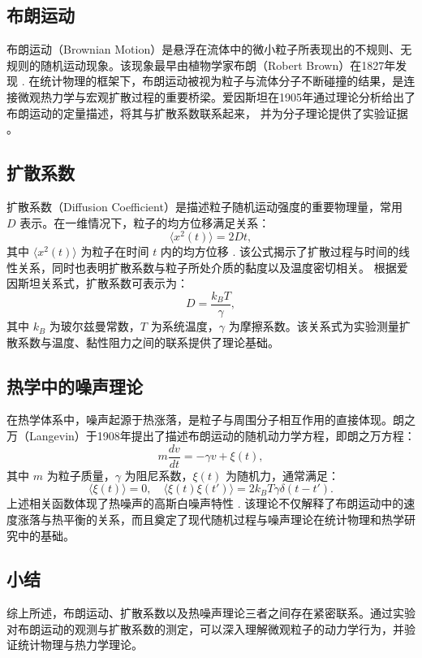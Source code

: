 \documentclass[a4paper]{report} %
\begin{document}
\subsection{布朗运动}
布朗运动（Brownian Motion）是悬浮在流体中的微小粒子所表现出的不规则、无规则的随机运动现象。该现象最早由植物学家布朗（Robert Brown）在1827年发现 \cite{brown1828}. 
在统计物理的框架下，布朗运动被视为粒子与流体分子不断碰撞的结果，是连接微观热力学与宏观扩散过程的重要桥梁。爱因斯坦在1905年通过理论分析给出了布朗运动的定量描述，将其与扩散系数联系起来，
并为分子理论提供了实验证据 \cite{einstein1905}。
\subsection{扩散系数}
扩散系数（Diffusion Coefficient）是描述粒子随机运动强度的重要物理量，常用 $D$ 表示。在一维情况下，粒子的均方位移满足关系：
\begin{equation}
\langle x^2(t) \rangle = 2Dt,
\end{equation}
其中 $\langle x^2(t) \rangle$ 为粒子在时间 $t$ 内的均方位移 \cite{uhlenbeck1930}. 该公式揭示了扩散过程与时间的线性关系，同时也表明扩散系数与粒子所处介质的黏度以及温度密切相关。
根据爱因斯坦关系式，扩散系数可表示为：
\begin{equation}
D = \frac{k_B T}{\gamma},
\end{equation}
其中 $k_B$ 为玻尔兹曼常数，$T$ 为系统温度，$\gamma$ 为摩擦系数。该关系式为实验测量扩散系数与温度、黏性阻力之间的联系提供了理论基础。

\subsection{热学中的噪声理论}
在热学体系中，噪声起源于热涨落，是粒子与周围分子相互作用的直接体现。朗之万（Langevin）于1908年提出了描述布朗运动的随机动力学方程，即朗之万方程：
\begin{equation}
m \frac{dv}{dt} = -\gamma v + \xi(t),
\end{equation}
其中 $m$ 为粒子质量，$\gamma$ 为阻尼系数，$\xi(t)$ 为随机力，通常满足：
\begin{equation}
\langle \xi(t) \rangle = 0, \quad \langle \xi(t)\xi(t') \rangle = 2k_B T \gamma \delta(t-t').
\end{equation}
上述相关函数体现了热噪声的高斯白噪声特性 \cite{kubo1966}. 该理论不仅解释了布朗运动中的速度涨落与热平衡的关系，而且奠定了现代随机过程与噪声理论在统计物理和热学研究中的基础。

\subsection{小结}
综上所述，布朗运动、扩散系数以及热噪声理论三者之间存在紧密联系。通过实验对布朗运动的观测与扩散系数的测定，可以深入理解微观粒子的动力学行为，并验证统计物理与热力学理论。
\end{document}
